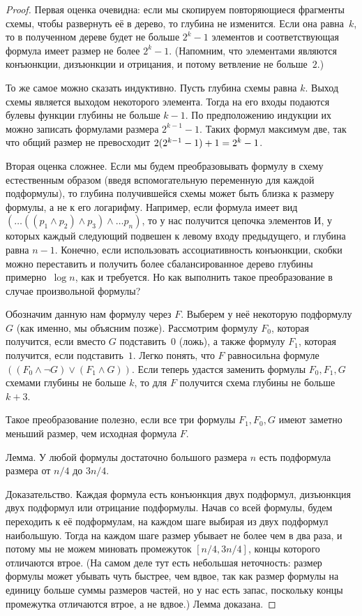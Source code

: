 \begin{proof}
Первая оценка очевидна: если мы скопируем повторяющиеся
фрагменты схемы, чтобы развернуть её в дерево, то глубина не
изменится. Если она равна~$k$, то в полученном дереве будет не
больше $2^k-1$ элементов и соответствующая формула имеет размер
не более ${2^k-1}$. (Напомним, что элементами являются
конъюнкции, дизъюнкции и отрицания, и потому ветвление не
больше~$2$.)

То же самое можно сказать индуктивно. Пусть глубина схемы равна
$k$. Выход схемы является выходом некоторого элемента. Тогда на
его входы подаются булевы функции глубины не больше $k-1$. По
предположению индукции их можно записать формулами размера
$2^{k-1}-1$. Таких формул максимум две, так что общий размер не
превосходит $2(2^{k-1}-1)+1\hm=2^k-1$.

Вторая оценка сложнее. Если мы будем преобразовывать формулу в
схему естественным образом (введя вспомогательную переменную для
каждой подформулы), то глубина получившейся схемы может быть
близка к размеру формулы, а не к его логарифму. Например, если
формула имеет вид $(\ldots((p_1\land p_2)\land p_3)\land\dots
p_n)$, то у нас получится цепочка элементов И, у которых каждый
следующий подвешен к левому входу предыдущего, и глубина равна
${n-1}$. Конечно, если использовать ассоциативность конъюнкции,
скобки можно переставить и получить более сбалансированное
дерево глубины примерно~$\log n$, как и требуется. Но как
выполнить такое преобразование в случае произвольной формулы?

Обозначим данную нам формулу через $F$. Выберем у неё некоторую
подформулу $G$ (как именно, мы объясним позже). Рассмотрим
формулу $F_0$, которая получится, если вместо $G$ подставить~$0$
(ложь), а также формулу $F_1$, которая получится, если
подставить~$1$. Легко понять, что $F$ равносильна формуле
        $
((F_0 \land\lnot G)\lor (F_1\land G)).
        $
Если теперь удастся заменить формулы $F_0, F_1, G$ схемами
глубины не больше $k$, то для $F$ получится схема
глубины не больше~$k+3$.

Такое преобразование полезно, если все три формулы $F_1, F_0, G$
имеют заметно меньший размер, чем исходная формула $F$.

\textsf{Лемма}. У любой формулы достаточно большого размера $n$
есть подформула размера от $n/4$ до $3n/4$.

Доказательство. Каждая формула есть конъюнкция двух подформул,
дизъюнкция двух подформул или отрицание подформулы. Начав со всей
формулы, будем переходить к её подформулам, на каждом шаге
выбирая из двух подформул
наибольшую.
Тогда на каждом шаге размер убывает не более чем в два раза,
и потому мы не можем миновать
промежуток $[n/4, 3n/4]$, концы которого отличаются втрое. (На
самом деле тут есть небольшая неточность: размер формулы может
убывать чуть быстрее, чем вдвое, так как размер формулы на
единицу больше суммы размеров частей, но у нас есть запас,
поскольку концы промежутка отличаются втрое, а не вдвое.) Лемма
доказана.


\end{proof}
